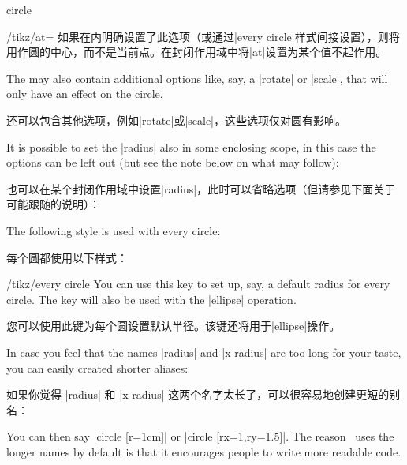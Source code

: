 \begin{pathoperation}{circle}{}
\begin{key}{/tikz/at=}
        如果在内明确设置了此选项（或通过|every circle|样式间接设置），则将用作圆的中心，而不是当前点。在封闭作用域中将|at|设置为某个值不起作用。
    \end{key}
    The  may also contain additional options like, say, a
    |rotate| or |scale|, that will only have an effect on the circle.


     还可以包含其他选项，例如|rotate|或|scale|，这些选项仅对圆有影响。
\begin{codeexample}[]
\end{codeexample}

    It is possible to set the |radius| also in some enclosing scope, in this
    case the options can be left out (but see the note below on what may
    follow):

    也可以在某个封闭作用域中设置|radius|，此时可以省略选项（但请参见下面关于可能跟随的说明）：

\begin{codeexample}[]
\end{codeexample}

    The following style is used with every circle:

    每个圆都使用以下样式：

    \begin{stylekey}{/tikz/every circle}
        You can use this key to set up, say, a default radius for every circle.
        The key will also be used with the |ellipse| operation.

        您可以使用此键为每个圆设置默认半径。该键还将用于|ellipse|操作。

    \end{stylekey}

    In case you feel that the names |radius| and |x radius| are too long for
    your taste, you can easily created shorter aliases:
    
    如果你觉得 |radius| 和 |x radius| 这两个名字太长了，可以很容易地创建更短的别名：
    
\begin{codeexample}
\end{codeexample}
    You can then say |circle [r=1cm]| or |circle [rx=1,ry=1.5]|. The reason
    \tikzname\ uses the longer names by default is that it encourages people to
    write more readable code.


\end{pathoperation}
